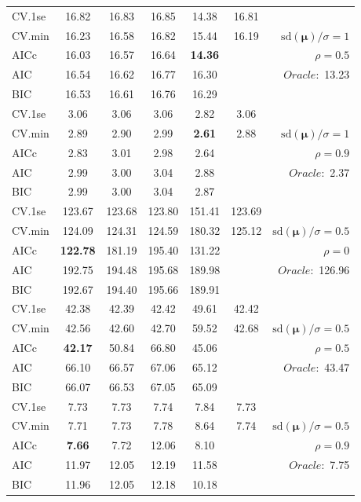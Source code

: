 \begin{table}
\begin{center}
\begin{tabular}{l*{5}{c}|r}
 \hline 
CV.1se & 16.82 & 16.83 & 16.85 & 14.38 & 16.81 & \\
CV.min & 16.23 & 16.58 & 16.82 & 15.44 & 16.19 &  $\mathrm{sd}(\mathbf{\mu})/\sigma=1$ \\
AICc & 16.03 & 16.57 & 16.64 & {\bf 14.36} & & $\rho=0.5$ \\
AIC & 16.54 & 16.62 & 16.77 & 16.30 & &  \multirow{2}{*}{$Oracle: $ 13.23} \\
BIC & 16.53 & 16.61 & 16.76 & 16.29 & &  \\
 \hline 
CV.1se & 3.06 & 3.06 & 3.06 & 2.82 & 3.06 & \\
CV.min & 2.89 & 2.90 & 2.99 & {\bf 2.61} & 2.88 &  $\mathrm{sd}(\mathbf{\mu})/\sigma=1$ \\
AICc & 2.83 & 3.01 & 2.98 & 2.64 & & $\rho=0.9$ \\
AIC & 2.99 & 3.00 & 3.04 & 2.88 & &  \multirow{2}{*}{$Oracle: $ 2.37} \\
BIC & 2.99 & 3.00 & 3.04 & 2.87 & &  \\
 \hline 
CV.1se & 123.67 & 123.68 & 123.80 & 151.41 & 123.69 & \\
CV.min & 124.09 & 124.31 & 124.59 & 180.32 & 125.12 &  $\mathrm{sd}(\mathbf{\mu})/\sigma=0.5$ \\
AICc & {\bf 122.78} & 181.19 & 195.40 & 131.22 & & $\rho=0$ \\
AIC & 192.75 & 194.48 & 195.68 & 189.98 & &  \multirow{2}{*}{$Oracle: $ 126.96} \\
BIC & 192.67 & 194.40 & 195.66 & 189.91 & &  \\
 \hline 
CV.1se & 42.38 & 42.39 & 42.42 & 49.61 & 42.42 & \\
CV.min & 42.56 & 42.60 & 42.70 & 59.52 & 42.68 &  $\mathrm{sd}(\mathbf{\mu})/\sigma=0.5$ \\
AICc & {\bf 42.17} & 50.84 & 66.80 & 45.06 & & $\rho=0.5$ \\
AIC & 66.10 & 66.57 & 67.06 & 65.12 & &  \multirow{2}{*}{$Oracle: $ 43.47} \\
BIC & 66.07 & 66.53 & 67.05 & 65.09 & &  \\
 \hline 
CV.1se & 7.73 & 7.73 & 7.74 & 7.84 & 7.73 & \\
CV.min & 7.71 & 7.73 & 7.78 & 8.64 & 7.74 &  $\mathrm{sd}(\mathbf{\mu})/\sigma=0.5$ \\
AICc & {\bf 7.66} & 7.72 & 12.06 & 8.10 & & $\rho=0.9$ \\
AIC & 11.97 & 12.05 & 12.19 & 11.58 & &  \multirow{2}{*}{$Oracle: $ 7.75} \\
BIC & 11.96 & 12.05 & 12.18 & 10.18 & &  \\
 \hline 
\end{tabular}
\end{center}
\vspace{-1cm}
\end{table}




